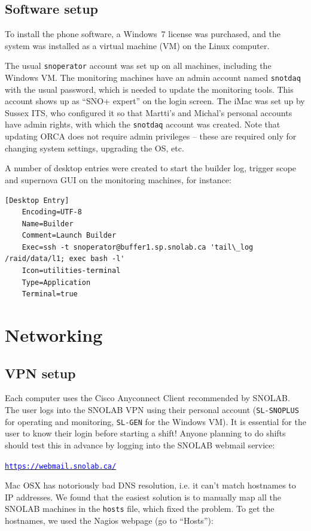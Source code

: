 \documentclass[a4paper,10pt]{article}
\newcommand{\link}[1]{\href{#1}{\textcolor{blue}{\texttt{#1}}}} %
\begin{document}
\subsection{Software setup}
To install the phone software, a Windows~7 license was purchased, and the system was installed as a virtual machine (VM) on the Linux computer.

The usual {\tt snoperator} account was set up on all machines, including the Windows VM. The monitoring machines have an admin account named {\tt snotdaq} with the usual password, which is needed to update the monitoring tools. This account shows up as ``SNO+ expert'' on the login screen. The iMac was set up by Sussex ITS, who configured it so that Martti's and Michal's personal accounts have admin rights, with which the {\tt snotdaq} account was created. Note that updating ORCA does not require admin privileges -- these are required only for changing system settings, upgrading the OS, etc.

A number of desktop entries were created to start the builder log, trigger scope and supernova GUI on the monitoring machines, for instance:
{\small
\begin{Verbatim}[xleftmargin=-8mm]
	[Desktop Entry]
	Encoding=UTF-8
	Name=Builder
	Comment=Launch Builder
	Exec=ssh -t snoperator@buffer1.sp.snolab.ca 'tail\_log /raid/data/l1; exec bash -l'
	Icon=utilities-terminal
	Type=Application
	Terminal=true
\end{Verbatim}
}


\section{Networking}

\subsection{VPN setup}
Each computer uses the Cisco Anyconnect Client recommended by SNOLAB. The user logs into the SNOLAB VPN using their personal account ({\tt SL-SNOPLUS} for operating and monitoring, {\tt SL-GEN} for the Windows VM). It is essential for the user to know their login before starting a shift! Anyone planning to do shifts should test this in advance by logging into the SNOLAB webmail service: 

\qquad\link{https://webmail.snolab.ca/}

Mac OSX has notoriously bad DNS resolution, i.e. it can't match hostnames to IP addresses. We found that the easiest solution is to manually map all the SNOLAB machines in the {\tt hosts} file, which fixed the problem. To get the hostnames, we used the Nagios webpage (go to ``Hosts''):
\end{document}
